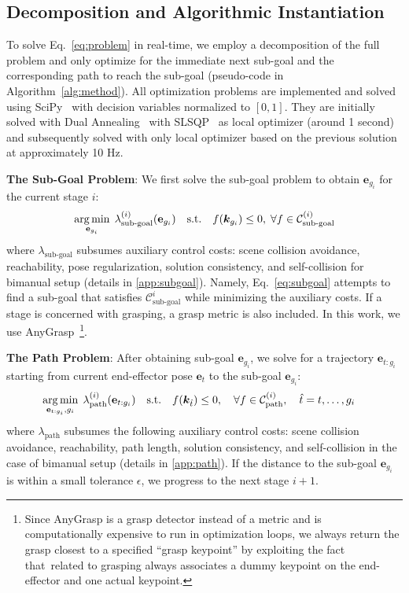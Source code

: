 \subsection{Decomposition and Algorithmic Instantiation}\label{sec:algorithm}
To solve Eq.~\ref{eq:problem} in real-time,
we employ a decomposition of the full problem and only optimize for the immediate next sub-goal and the corresponding path to reach the sub-goal (pseudo-code in Algorithm~\ref{alg:method}).
All optimization problems are implemented and solved using SciPy~\cite{virtanen2020scipy} with decision variables normalized to $[0, 1]$.
They are initially solved with Dual Annealing~\cite{xiang1997generalized} with SLSQP~\cite{kraft1988software} as local optimizer (around 1 second) and subsequently solved with only local optimizer based on the previous solution at approximately 10 Hz.

\textbf{The Sub-Goal Problem}: We first solve the sub-goal problem to obtain $\mathbf{e}_{g_i}$ for the current stage $i$:
\begin{equation}\label{eq:subgoal}
\begin{aligned}
\operatorname*{arg\,min}_{\mathbf{e}_{g_i}} \; \lambda_{\text{sub-goal}}^{(i)}(\mathbf{e}_{g_i}) \quad
\text{s.t.} \quad
f(\bm{k}_{g_i}) \leq 0, \; \forall f \in \mathcal{C}_{\text{sub-goal}}^{(i)}
\end{aligned}
\end{equation}
where $\lambda_{\text{sub-goal}}$ subsumes auxiliary control costs: scene collision avoidance, reachability, pose regularization, solution consistency, and self-collision for bimanual setup (details in \ref{app:subgoal}).
Namely, Eq.~\ref{eq:subgoal} attempts to find a sub-goal that satisfies $\mathcal{C}_{\text{sub-goal}}^{i}$ while minimizing the auxiliary costs.
If a stage is concerned with grasping, a grasp metric is also included. In this work, we use AnyGrasp~\cite{fang2023anygrasp}\footnote{Since AnyGrasp is a grasp detector instead of a metric and is computationally expensive to run in optimization loops, we always return the grasp closest to a specified ``grasp keypoint'' by exploiting the fact that~\algabrvname related to grasping always associates a dummy keypoint on the end-effector and one actual keypoint.}.

\textbf{The Path Problem}: After obtaining sub-goal $\mathbf{e}_{g_i}$, we solve for a trajectory $\mathbf{e}_{t:g_i}$ starting from current end-effector pose $\mathbf{e}_t$ to the sub-goal $\mathbf{e}_{g_i}$:
\begin{equation}\label{eq:path}
\begin{aligned}
\operatorname*{arg\,min}_{\mathbf{e}_{t:g_i}, g_i} \; \lambda_{\text{path}}^{(i)}(\mathbf{e}_{t:g_i}) \quad
\text{s.t.} \quad
& f(\bm{k}_{\hat{t}}) \leq 0, \quad \forall f \in \mathcal{C}_{\text{path}}^{(i)}, \quad \hat{t} = t, \ldots, g_i
\end{aligned}
\end{equation}
where $\lambda_{\text{path}}$ subsumes the following auxiliary control costs: scene collision avoidance, reachability, path length, solution consistency, and self-collision in the case of bimanual setup (details in \ref{app:path}).
If the distance to the sub-goal $\mathbf{e}_{g_i}$ is within a small tolerance $\epsilon$, we progress to the next stage $i+1$.


